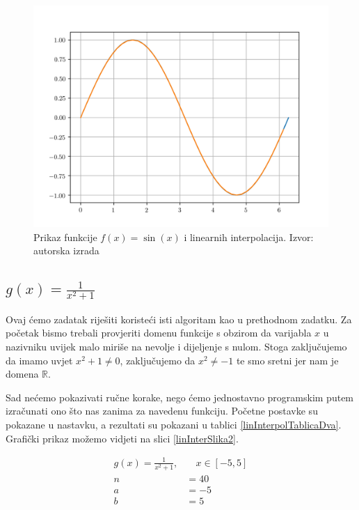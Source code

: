 \documentclass[12pt,a4paper]{report}
\begin{document}
			\begin{figure}[H]
				\includegraphics[width=\textwidth]{slike/usporedbaLinearneInterpolacijeSin.png}
				\caption{Prikaz funkcije $f(x)=\sin (x)$ i linearnih interpolacija. Izvor: autorska izrada}
			\end{figure}
		\subsection{$g(x)=\frac{1}{x^2 +1}$}
			Ovaj ćemo zadatak riješiti koristeći isti algoritam kao u prethodnom zadatku. Za početak bismo trebali provjeriti domenu funkcije s obzirom da varijabla $x$ u nazivniku uvijek malo miriše na nevolje i dijeljenje s nulom. Stoga zaključujemo da imamo uvjet $x^2+1\neq0$, zaključujemo da $x^2\neq-1$ te smo sretni jer nam je domena $\mathbb{R}$.
			
			Sad nećemo pokazivati ručne korake, nego ćemo jednostavno programskim putem izračunati ono što nas zanima za navedenu funkciju. Početne postavke su pokazane u nastavku, a rezultati su pokazani u tablici \ref{linInterpolTablicaDva}. Grafički prikaz možemo vidjeti na slici \ref{linInterSlika2}.
			
			\begin{align*}
			g(x)=\frac{1}{x^2 +1},& \quad x\in [-5,5]\\
			n&=40\\
			a&=-5\\
			b&=5\\
			\end{align*}
			
\end{document}
